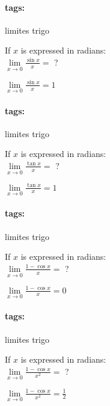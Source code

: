\documentclass[12pt]{article}
\newcommand*{\xfield}[1]{\begin{mdframed}\centering #1\end{mdframed}\bigskip}
\newenvironment{note}{}{}
\newcommand*{\tags}[1]{\paragraph{tags: }#1}
\begin{document}
\begin{note}
\begin{note}
	\tags{limites trigo}
	\xfield{If $x$ is expressed in radians:\\
	$\lim\limits_{x \to 0} \frac{\sin x}{x} =$ ?}
	\xfield{$\lim\limits_{x \to 0} \frac{\sin x}{x} = 1$}
\end{note}

\begin{note}
	\tags{limites trigo}
	\xfield{If $x$ is expressed in radians:\\
	$\lim\limits_{x \to 0} \frac{\tan x}{x} = $ ?}
	\xfield{$\lim\limits_{x \to 0} \frac{\tan x}{x} = 1$}
\end{note}

\begin{note}
	\tags{limites trigo}
	\xfield{If $x$ is expressed in radians:\\
	$\lim\limits_{x \to 0} \frac{1-\cos x}{x} =$ ?}
	\xfield{$\lim\limits_{x \to 0} \frac{1-\cos x}{x} = 0$}
\end{note}

\begin{note}
	\tags{limites trigo}
	\xfield{If $x$ is expressed in radians:\\
	$\lim\limits_{x \to 0} \frac{1-\cos x}{x^2} =$ ?}
	\xfield{$\lim\limits_{x \to 0} \frac{1-\cos x}{x^2} = \frac{1}{2}$}
\end{note}


\end{note}
\end{document}
